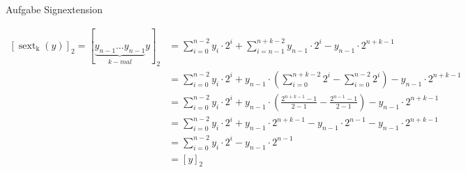 \begin{frame}[allowframebreaks]{Aufgabe \thesection}{Signextension}
\begin{solution}
\begin{enumerate}
        $\begin{aligned}
          {\left[\operatorname{sext}_{\mathrm{k}}(y)\right]_2=[\underbrace{y_{n-1} \ldots y_{n-1}}_{k-m a l}y]_2 } & =\sum_{i=0}^{n-2} y_i \cdot 2^i+\sum_{i=n-1}^{n+k-2} y_{n-1} \cdot 2^i-y_{n-1} \cdot 2^{n+k-1} \\
                                                                                                                   & =\sum_{i=0}^{n-2} y_i \cdot 2^i+y_{n-1} \cdot\left(\sum_{i=0}^{n+k-2} 2^i-\sum_{i=0}^{n-2} 2^i\right)-y_{n-1} \cdot 2^{n+k-1} \\
                                                                                                                   & =\sum_{i=0}^{n-2} y_i \cdot 2^i+y_{n-1} \cdot\left(\frac{2^{n+k-1}-1}{2-1}-\frac{2^{n-1}-1}{2-1}\right)-y_{n-1} \cdot 2^{n+k-1} \\
                                                                                                                   & =\sum_{i=0}^{n-2} y_i \cdot 2^i+y_{n-1} \cdot 2^{n+k-1}-y_{n-1} \cdot 2^{n-1}-y_{n-1} \cdot 2^{n+k-1} \\
                                                                                                                   & =\sum_{i=0}^{n-2} y_i \cdot 2^i-y_{n-1} \cdot 2^{n-1} \\
                                                                                                                   & =[y]_2
        \end{aligned}$
    \end{enumerate}
  \end{solution}
\end{frame}
